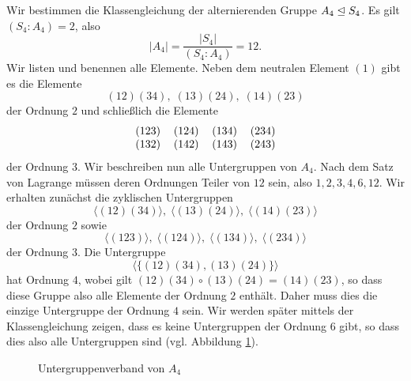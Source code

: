 \documentclass{book}
\begin{document}
\begin{exa}
    \label{exa:a4}
    Wir bestimmen die Klassengleichung der alternierenden Gruppe $A_4 \trianglelefteq S_4$. Es gilt $(S_4:A_4) = 2$, also 
    \[
        |A_4| = \frac{|S_4|}{(S_4:A_4)} = 12.
    \]
    Wir listen und benennen alle Elemente. Neben dem neutralen Element $(1)$ gibt es die Elemente
    \[
        (12)(34),\; (13)(24),\; (14)(23)
    \]
    der Ordnung $2$ und schließlich die Elemente
    \[
        \begin{tabular}{llll}
            (123) & (124) & (134) & (234)\\
            (132) & (142) & (143) & (243)
        \end{tabular}
    \]
    der Ordnung $3$. Wir beschreiben nun alle Untergruppen von $A_4$. Nach dem Satz von Lagrange müssen deren Ordnungen Teiler von $12$ sein, also $1,2,3,4,6,12$. 
    Wir erhalten zunächst die zyklischen Untergruppen 
    \[
        \langle(12)(34)\rangle,\;\langle(13)(24)\rangle,\;\langle(14)(23)\rangle
    \]
    der Ordnung $2$ sowie
    \[
        \langle(123)\rangle,\;\langle(124)\rangle,\;\langle(134)\rangle,\;\langle(234)\rangle
    \]
    der Ordnung $3$. Die Untergruppe 
    \[
        \langle\{(12)(34),(13)(24)\}\rangle
    \]
    hat Ordnung $4$, wobei gilt $(12)(34)\circ(13)(24) = (14)(23)$, so dass
    diese Gruppe also alle Elemente der Ordnung $2$ enthält. Daher muss dies
    die einzige Untergruppe der Ordnung $4$ sein. Wir werden später mittels der
    Klassengleichung zeigen, dass es keine Untergruppen der Ordnung $6$ gibt,
    so dass dies also alle Untergruppen sind (vgl. Abbildung \ref{fig:latticea4}).
    \begin{figure}[htpb]
        \centering
        \small
        \caption{Untergruppenverband von $A_4$}%
        \label{fig:latticea4}
    \end{figure}


\end{exa}
\end{document}
